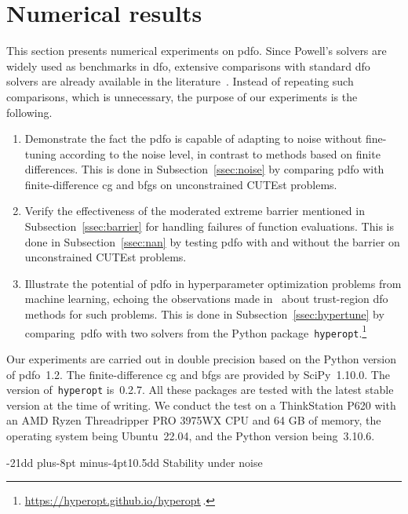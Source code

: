\documentclass[
    smallextended,  %
    draft,          %
    final,          %
]{svjour3}
\makeatletter
\def\subsection{\@startsection{subsection}{2}{\z@}%
    {-21dd plus-8pt minus-4pt}{10.5dd}
     {\normalsize\bfseries}}
\makeatother
\begin{document}
\section{Numerical results}
\label{sec:numerical}

This section presents numerical experiments on \gls{pdfo}.
Since Powell's solvers are widely used as benchmarks in \gls{dfo},
extensive comparisons with standard \gls{dfo} solvers are
already available in the literature~\cite{More_Wild_2009,Rios_Sahinidis_2013}.
Instead of repeating such comparisons, which is unnecessary,
the purpose of our experiments is the following.
\begin{enumerate}
    \item Demonstrate the fact the \gls{pdfo} is capable of adapting to noise without fine-tuning
        according to the noise level, in contrast to methods based on finite differences.
        This is done in Subsection~\ref{ssec:noise} by comparing \gls{pdfo} with finite-difference
        \gls{cg} and \gls{bfgs} on unconstrained CUTEst problems.
    \item Verify the effectiveness of the moderated extreme barrier mentioned in
        Subsection~\ref{ssec:barrier} for handling failures of function
        evaluations.
        This is done in Subsection~\ref{ssec:nan} by testing \gls{pdfo} with and
        without the barrier on unconstrained CUTEst problems.
    \item Illustrate the potential of \gls{pdfo} in hyperparameter optimization problems from
        machine learning, echoing the observations made in~\cite{Ghanbari_Scheinberg_2017} about
        trust-region \gls{dfo} methods for such problems.
        This is done in Subsection~\ref{ssec:hypertune} by comparing~\gls{pdfo} with two solvers
        from the Python package~\texttt{hyperopt}.\footnote{\url{https://hyperopt.github.io/hyperopt}\,.}
\end{enumerate}

Our experiments are carried out in double precision based on the Python version of \gls{pdfo}~1.2.
The finite-difference \gls{cg} and \gls{bfgs} are provided by SciPy~1.10.0.
The version of~\texttt{hyperopt} is~0.2.7.
All these packages are tested with the latest stable version
at the time of writing.
We conduct the test on a ThinkStation P620 with an AMD Ryzen Threadripper
PRO 3975WX CPU and 64 GB of memory, the operating system being Ubuntu~22.04, and the Python version
being~3.10.6.


\subsection{Stability under noise}
\label{ssec:noise}
\end{document}
